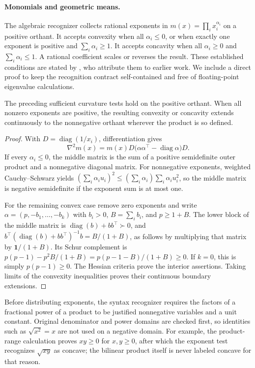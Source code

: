 \paragraph{Monomials and geometric means.}
The algebraic recognizer collects rational exponents in
$m(x)=\prod_i x_i^{\alpha_i}$ on a positive orthant. It accepts convexity when all $\alpha_i\leq0$, or when exactly one exponent is positive and $\sum_i\alpha_i\geq1$. It accepts concavity when all $\alpha_i\geq0$ and $\sum_i\alpha_i\leq1$. A rational coefficient scales or reverses the result. These established conditions are stated by \citet[Theorems~2.1--2.2, p.~507]{lundell2009-signomial}, who attribute them to earlier work. We include a direct proof to keep the recognition contract self-contained and free of floating-point eigenvalue calculations.
\begin{lemma}
\label{lem:monomial-recognition}
The preceding sufficient curvature tests hold on the positive orthant. When all nonzero exponents are positive, the resulting convexity or concavity extends continuously to the nonnegative orthant wherever the product is so defined.
\end{lemma}
\begin{proof}
With $D=\operatorname{diag}(1/x_i)$, differentiation gives
\[
 \nabla^2m(x)=m(x)D\bigl(\alpha\alpha^\top-\operatorname{diag}\alpha\bigr)D.
\]
If every $\alpha_i\leq0$, the middle matrix is the sum of a positive semidefinite outer product and a nonnegative diagonal matrix. For nonnegative exponents, weighted Cauchy--Schwarz yields
$(\sum_i\alpha_i u_i)^2\leq(\sum_i\alpha_i)\sum_i\alpha_i u_i^2$,
so the middle matrix is negative semidefinite if the exponent sum is at most one.

For the remaining convex case remove zero exponents and write $\alpha=(p,-b_1,\ldots,-b_k)$ with $b_i>0$, $B=\sum_i b_i$, and $p\geq1+B$. The lower block of the middle matrix is $\operatorname{diag}(b)+bb^\top\succ0$, and
$b^\top(\operatorname{diag}(b)+bb^\top)^{-1}b=B/(1+B)$,
as follows by multiplying that matrix by $\mathbf 1/(1+B)$. Its Schur complement is $p(p-1)-p^2B/(1+B)=p(p-1-B)/(1+B)\geq0$. If $k=0$, this is simply $p(p-1)\geq0$. The Hessian criteria prove the interior assertions. Taking limits of the convexity inequalities proves their continuous boundary extensions.
\end{proof}
Before distributing exponents, the syntax recognizer requires the factors of a fractional power of a product to be justified nonnegative variables and a unit constant. Original denominator and power domains are checked first, so identities such as $\sqrt{x^2}=x$ are not used on a negative domain. For example, the product-range calculation proves $xy\geq0$ for $x,y\geq0$, after which the exponent test recognizes $\sqrt{xy}$ as concave; the bilinear product itself is never labeled concave for that reason.

